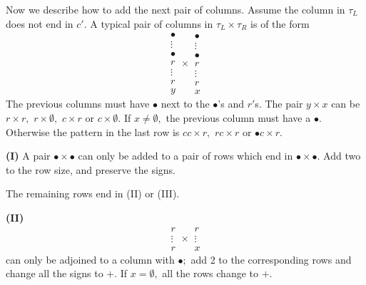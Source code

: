 \documentclass[11pt ,reqno]{amsart}
\begin{document}
\bigskip
\noindent Now we describe how to add the next pair of columns. Assume
the column in $\tau_L$ does not end in $c'.$ A 
typical pair of columns in $\tau_L\times \tau_R$ is of the form
$$
\begin{matrix}
  \bullet\\ \vdots \\\bullet\\ r\\ \vdots \\r \\y
\end{matrix}
\times
\begin{matrix}
  \bullet\\ \vdots \\\bullet\\ r\\ \vdots \\r \\ x
\end{matrix}
$$
The previous columns must have $\bullet$ next to the $\bullet$'s and $r'$s.
The pair $y\times x$ can be $r\times r,$ $r\times\emptyset,$ $c\times r$
or $c\times\emptyset.$ If $x\ne \emptyset,$ the previous column must have
a $\bullet.$ Otherwise the pattern in the last row is $cc\times r,$ $rc\times r$ or
$\bullet c\times r.$ 

\bigskip
\noindent\textbf{(I)} A pair $\bullet\times\bullet$ can only be added
to a pair of rows which end in $\bullet\times\bullet.$ Add two to the
row size, and preserve the signs.  

The remaining rows end in  (II) or (III).

\noindent\textbf{(II)} 
\begin{equation}
\begin{matrix} r\\ \vdots\\ r\end{matrix}\times\begin{matrix} r\\ \vdots\\ x\end{matrix}
\label{3.2.7}\end{equation}
can only be adjoined to a column with $\bullet;$ add 2 to the
corresponding rows and change all the signs to $+.$ If $x=\emptyset,$
all the rows change to $+.$ 
\end{document}
